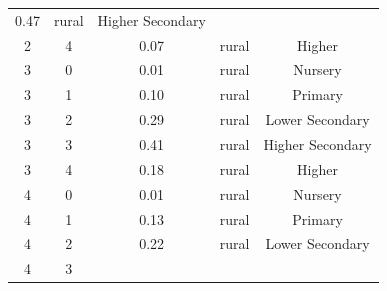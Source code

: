 \documentclass[stu, 12pt, floatsintext,longtable]{apa7}
\begin{document}
\begin{longtable}{ccccc}
    0.47
                                                       &
    rural                                              & Higher Secondary
    \\
    2                                                  & 4                    &
    0.07
                                                       &
    rural                                              & Higher
    \\
    3                                                  & 0                    &
    0.01
                                                       &
    rural                                              & Nursery
    \\
    3                                                  & 1                    &
    0.10
                                                       &
    rural                                              & Primary
    \\
    3                                                  & 2                    &
    0.29
                                                       &
    rural                                              & Lower Secondary
    \\
    3                                                  & 3                    &
    0.41
                                                       &
    rural                                              & Higher Secondary
    \\
    3                                                  & 4                    &
    0.18
                                                       &
    rural                                              & Higher
    \\
    4                                                  & 0                    &
    0.01
                                                       &
    rural                                              & Nursery
    \\
    4                                                  & 1                    &
    0.13
                                                       &
    rural                                              & Primary
    \\
    4                                                  & 2                    &
    0.22
                                                       &
    rural                                              & Lower Secondary
    \\
    4                                                  & 3                    &

\end{longtable}
\end{document}
